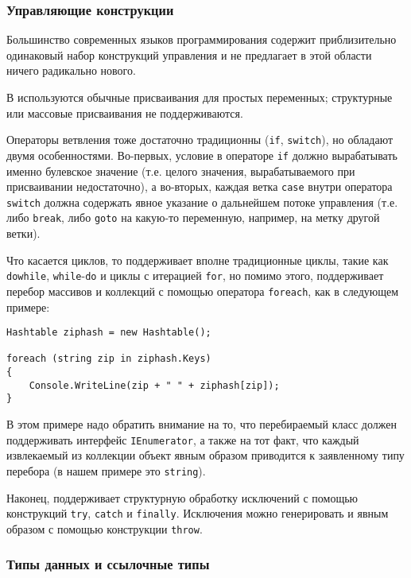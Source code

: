 \subsubsection{Управляющие конструкции \CSharp}

Большинство современных языков программирования содержит приблизительно одинаковый набор конструкций управления и \CSharp не предлагает в этой области ничего радикально нового.

В \CSharp используются обычные присваивания для простых переменных; структурные или массовые присваивания не поддерживаются.

Операторы ветвления тоже достаточно традиционны (\lstinline{if}, \lstinline{switch}), но обладают двумя особенностями. Во-первых, условие в операторе \lstinline{if} должно вырабатывать именно булевское значение (т.е. целого значения, вырабатываемого при присваивании недостаточно), а во-вторых, каждая ветка \lstinline{case} внутри оператора \lstinline{switch} должна содержать явное указание о дальнейшем потоке управления (т.е. либо \lstinline{break}, либо \lstinline{goto} на какую-то переменную, например, на метку другой ветки).

Что касается циклов, то \CSharp поддерживает вполне традиционные циклы, такие как \lstinline{dowhile}, \lstinline{while}-\lstinline{do} и циклы с итерацией \lstinline{for}, но помимо этого, поддерживает перебор массивов и коллекций с помощью оператора \lstinline{foreach}, как в следующем примере:

\begin{lstlisting}[caption={Пример перебора коллекций}]
Hashtable ziphash = new Hashtable();

foreach (string zip in ziphash.Keys)
{
    Console.WriteLine(zip + " " + ziphash[zip]);
}
\end{lstlisting}

В этом примере надо обратить внимание на то, что перебираемый класс должен поддерживать интерфейс \lstinline{IEnumerator}, а также на тот факт, что каждый извлекаемый из коллекции объект явным образом приводится к заявленному типу перебора (в нашем примере это \lstinline{string}).

Наконец, \CSharp поддерживает структурную обработку исключений с помощью конструкций \lstinline{try}, \lstinline{catch} и \lstinline{finally}. Исключения можно генерировать и явным образом с помощью конструкции \lstinline{throw}.


\subsubsection{Типы данных и ссылочные типы}

